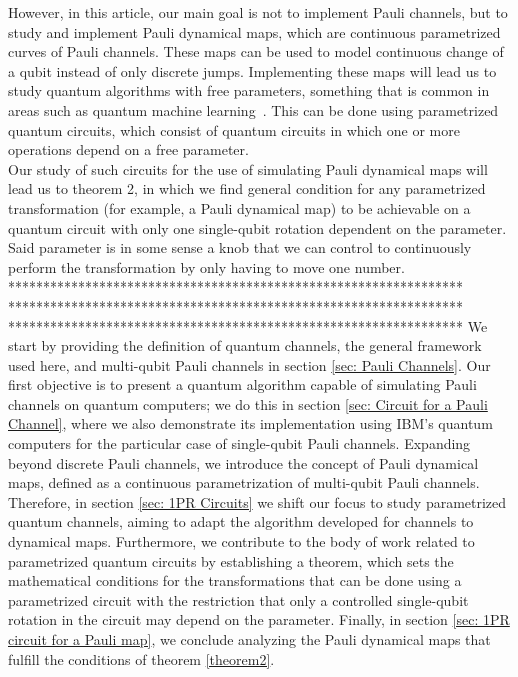 \documentclass[10pt,letterpaper]{article} %
\begin{document}
However, in this article, our main goal is not to implement Pauli channels, but to study and implement Pauli dynamical maps, which are continuous parametrized curves of Pauli channels. 
These maps can be used to model continuous change of a qubit instead of only discrete jumps.
Implementing these maps will lead us to study  quantum algorithms with free parameters, 
something that is common in areas such as quantum machine learning~\cite{Benedetti}.
This can be done using parametrized quantum circuits, which consist of quantum circuits in which one or more operations depend on a free parameter. \\

Our study of such circuits for the use of simulating Pauli dynamical maps will lead 
us to theorem 2, in which we find general condition for any parametrized
transformation (for example, a Pauli dynamical map) to be achievable on a quantum circuit 
with only one single-qubit rotation dependent on the parameter.
Said parameter is in some sense a knob that we can control to continuously perform the transformation by
only having to move one number. \\

*****************************************************************
*****************************************************************
*****************************************************************
We start by providing the definition of quantum channels, the general framework
used here, and multi-qubit Pauli channels in section \ref{sec: Pauli Channels}.
Our first objective is to present a quantum algorithm capable of simulating
Pauli channels on quantum computers; we do this in section \ref{sec: Circuit
for a Pauli Channel}, where we also demonstrate its implementation using IBM's
quantum computers for the particular case of single-qubit Pauli channels. 
Expanding beyond discrete Pauli channels, we introduce the concept of Pauli
dynamical maps, defined as a continuous parametrization of multi-qubit Pauli
channels.  Therefore, in section \ref{sec: 1PR Circuits} we shift our focus to
study parametrized quantum channels, aiming to adapt the algorithm developed
for channels to dynamical maps.  Furthermore, we contribute to the body of work
related to parametrized quantum circuits by establishing a theorem,
which  sets the mathematical conditions for the transformations
that can be done using a parametrized circuit with the restriction that only a
controlled single-qubit
rotation in the circuit may depend on the parameter.  Finally, in
section \ref{sec: 1PR circuit for a Pauli map}, we conclude analyzing the Pauli
dynamical maps that fulfill the conditions of theorem \ref{theorem2}. 
\end{document}
